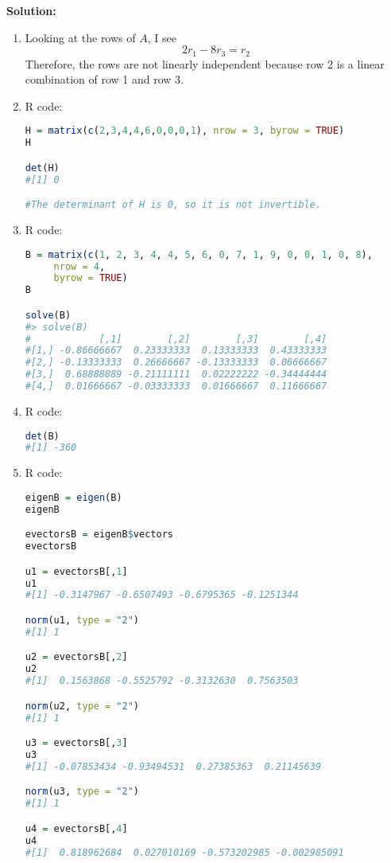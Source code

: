 \documentclass[12pt]{article}
\newenvironment{solution}{
    \textbf{Solution:}
    
}{
    
    \vspace{2em}
}
\begin{document}
\begin{solution}
    \begin{enumerate}[label=\alph*)]
        \item Looking at the rows of \(A\), I see
        \[
            2r_1 - 8r_3 = r_2
        \]
        Therefore, the rows are not linearly independent because row 2 is a linear combination of row 1 and row 3.
        \item R code:
        \begin{lstlisting}[language=R]
H = matrix(c(2,3,4,4,6,0,0,0,1), nrow = 3, byrow = TRUE)
H

det(H)
#[1] 0

#The determinant of H is 0, so it is not invertible.
        \end{lstlisting}
        \item R code:
        \begin{lstlisting}[language=R]
B = matrix(c(1, 2, 3, 4, 4, 5, 6, 0, 7, 1, 9, 0, 0, 1, 0, 8),
     nrow = 4,
     byrow = TRUE)
B

solve(B)
#> solve(B)
#            [,1]        [,2]        [,3]        [,4]
#[1,] -0.86666667  0.23333333  0.13333333  0.43333333
#[2,] -0.13333333  0.26666667 -0.13333333  0.06666667
#[3,]  0.68888889 -0.21111111  0.02222222 -0.34444444
#[4,]  0.01666667 -0.03333333  0.01666667  0.11666667
        \end{lstlisting}
        \item R code:
        \begin{lstlisting}[language=R]
det(B)
#[1] -360
        \end{lstlisting}
        \item R code:
        \begin{lstlisting}[language=R]
eigenB = eigen(B)
eigenB

evectorsB = eigenB$vectors
evectorsB

u1 = evectorsB[,1]
u1
#[1] -0.3147967 -0.6507493 -0.6795365 -0.1251344

norm(u1, type = "2")
#[1] 1

u2 = evectorsB[,2]
u2
#[1]  0.1563868 -0.5525792 -0.3132630  0.7563503

norm(u2, type = "2")
#[1] 1

u3 = evectorsB[,3]
u3
#[1] -0.07853434 -0.93494531  0.27385363  0.21145639

norm(u3, type = "2")
#[1] 1

u4 = evectorsB[,4]
u4
#[1]  0.818962684  0.027010169 -0.573202985 -0.002985091


\end{lstlisting}
\end{enumerate}
\end{solution}
\end{document}
